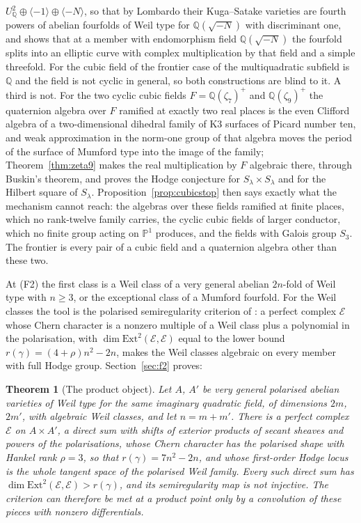 \documentclass[11pt,reqno]{amsart}
\numberwithin{equation}{section}
\theoremstyle{plain}
\newtheorem{theorem}{Theorem}[section]
\theoremstyle{definition}
\newcommand{\QQ}{\mathbb{Q}}
\newcommand{\Ext}{\mathrm{Ext}}
\newcommand{\Fii}{\texorpdfstring{\textup{(F2)}}{(F2)}}
\begin{document}
$U_{\QQ}^{2}\oplus\langle-1\rangle\oplus\langle-N\rangle$, so that by Lombardo their Kuga--Satake varieties are fourth powers of abelian fourfolds of Weil type for $\QQ(\sqrt{-N})$ with discriminant one, and shows that at a member with endomorphism field $\QQ(\sqrt{-N})$ the fourfold splits into an elliptic curve with complex multiplication by that field and a simple threefold. For the cubic field of the frontier case of \cite{BMB26} the multiquadratic subfield is $\QQ$ and the field is not cyclic in general, so both constructions are blind to it. A third is not. For the two cyclic cubic fields $F=\QQ(\zeta_{7})^{+}$ and $\QQ(\zeta_{9})^{+}$ the quaternion algebra over $F$ ramified at exactly two real places is the even Clifford algebra of a two-dimensional dihedral family of K3 surfaces of Picard number ten, and weak approximation in the norm-one group of that algebra moves the period of the surface of Mumford type into the image of the family; Theorem~\ref{thm:zeta9} makes the real multiplication by $F$ algebraic there, through Buskin's theorem, and proves the Hodge conjecture for $S_{\lambda}\times S_{\lambda}$ and for the Hilbert square of $S_{\lambda}$. Proposition~\ref{prop:cubicstop} then says exactly what the mechanism cannot reach: the algebras over these fields ramified at finite places, which no rank-twelve family carries, the cyclic cubic fields of larger conductor, which no finite group acting on $\mathbb{P}^{1}$ produces, and the fields with Galois group $S_{3}$. The frontier is every pair of a cubic field and a quaternion algebra other than these two.

At \Fii{} the first class is a Weil class of a very general abelian $2n$-fold of Weil type with $n\ge3$, or the exceptional class of a Mumford fourfold. For the Weil classes the tool is the polarised semiregularity criterion of \cite{BMB26}: a perfect complex $\mathcal{E}$ whose Chern character is a nonzero multiple of a Weil class plus a polynomial in the polarisation, with $\dim\Ext^{2}(\mathcal{E},\mathcal{E})$ equal to the lower bound $r(\gamma)=(4+\rho)n^{2}-2n$, makes the Weil classes algebraic on every member with full Hodge group. Section~\ref{sec:f2} proves:

\begin{theorem}[The product object]\label{thm:intro-product}
Let $A$, $A'$ be very general polarised abelian varieties of Weil type for the same imaginary quadratic field, of dimensions $2m$, $2m'$, with algebraic Weil classes, and let $n=m+m'$. There is a perfect complex $\mathcal{E}$ on $A\times A'$, a direct sum with shifts of exterior products of secant sheaves and powers of the polarisations, whose Chern character has the polarised shape with Hankel rank $\rho=3$, so that $r(\gamma)=7n^{2}-2n$, and whose first-order Hodge locus is the whole tangent space of the polarised Weil family. Every such direct sum has $\dim\Ext^{2}(\mathcal{E},\mathcal{E})>r(\gamma)$, and its semiregularity map is not injective. The criterion can therefore be met at a product point only by a convolution of these pieces with nonzero differentials.
\end{theorem}
\end{document}
